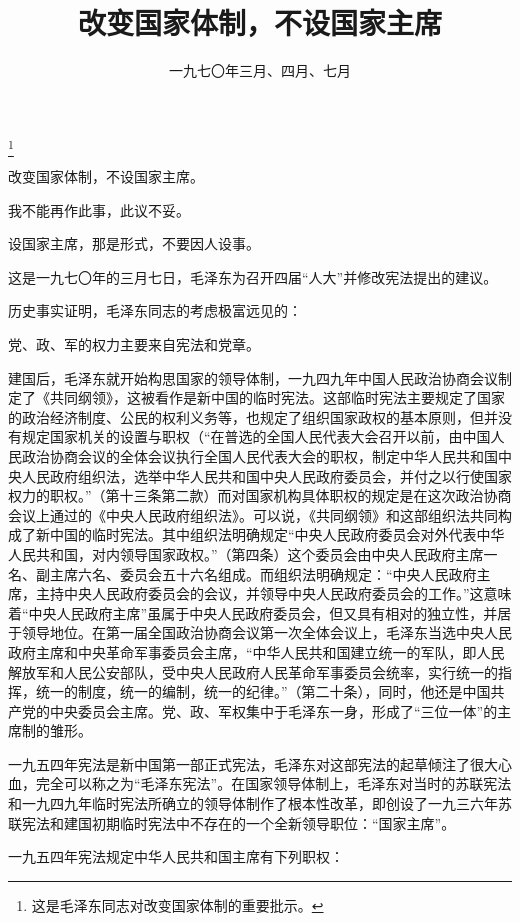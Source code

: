 
\title{改变国家体制，不设国家主席}
\date{一九七〇年三月、四月、七月}
\thanks{这是毛泽东同志对改变国家体制的重要批示。}
\maketitle


改变国家体制，不设国家主席。

我不能再作此事，此议不妥。

设国家主席，那是形式，不要因人设事。

\begin{maonote}
这是一九七〇年的三月七日，毛泽东为召开四届“人大”并修改宪法提出的建议。

历史事实证明，毛泽东同志的考虑极富远见的：

党、政、军的权力主要来自宪法和党章。

建国后，毛泽东就开始构思国家的领导体制，一九四九年中国人民政治协商会议制定了《共同纲领》，这被看作是新中国的临时宪法。这部临时宪法主要规定了国家的政治经济制度、公民的权利义务等，也规定了组织国家政权的基本原则，但并没有规定国家机关的设置与职权（“在普选的全国人民代表大会召开以前，由中国人民政治协商会议的全体会议执行全国人民代表大会的职权，制定中华人民共和国中央人民政府组织法，选举中华人民共和国中央人民政府委员会，并付之以行使国家权力的职权。”（第十三条第二款）而对国家机构具体职权的规定是在这次政治协商会议上通过的《中央人民政府组织法》。可以说，《共同纲领》和这部组织法共同构成了新中国的临时宪法。其中组织法明确规定“中央人民政府委员会对外代表中华人民共和国，对内领导国家政权。”（第四条）这个委员会由中央人民政府主席一名、副主席六名、委员会五十六名组成。而组织法明确规定：“中央人民政府主席，主持中央人民政府委员会的会议，并领导中央人民政府委员会的工作。”这意味着“中央人民政府主席”虽属于中央人民政府委员会，但又具有相对的独立性，并居于领导地位。在第一届全国政治协商会议第一次全体会议上，毛泽东当选中央人民政府主席和中央革命军事委员会主席，“中华人民共和国建立统一的军队，即人民解放军和人民公安部队，受中央人民政府人民革命军事委员会统率，实行统一的指挥，统一的制度，统一的编制，统一的纪律。”（第二十条），同时，他还是中国共产党的中央委员会主席。党、政、军权集中于毛泽东一身，形成了“三位一体”的主席制的雏形。

一九五四年宪法是新中国第一部正式宪法，毛泽东对这部宪法的起草倾注了很大心血，完全可以称之为“毛泽东宪法”。在国家领导体制上，毛泽东对当时的苏联宪法和一九四九年临时宪法所确立的领导体制作了根本性改革，即创设了一九三六年苏联宪法和建国初期临时宪法中不存在的一个全新领导职位：“国家主席”。

一九五四年宪法规定中华人民共和国主席有下列职权：


\end{maonote}
